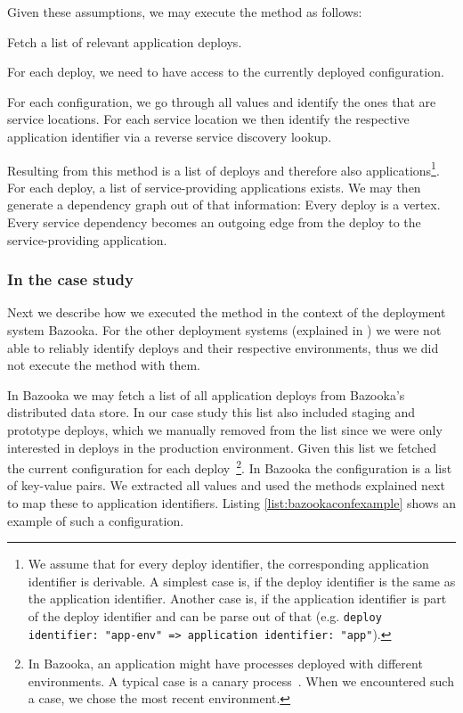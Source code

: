 Given these assumptions, we may execute the method as follows:
\begin{tenumerate}
  \item Fetch a list of relevant application deploys.
  \item For each deploy, we need to have access to the currently deployed configuration.
  \item For each configuration, we go through all values and identify the ones that are service locations. For each service location we then identify the respective application identifier via a reverse service discovery lookup.
\end{tenumerate}

\vfill\clearpage

Resulting from this method is a list of deploys and therefore also applications\footnote{We assume that for every deploy identifier, the corresponding application identifier is derivable. A simplest case is, if the deploy identifier is the same as the application identifier. Another case is, if the application identifier is part of the deploy identifier and can be parse out of that (e.g. \lstinline{deploy identifier: "app-env" => application identifier: "app"}).}. For each deploy, a list of service-providing applications exists. We may then generate a dependency graph out of that information: Every deploy is a vertex. Every service dependency becomes an outgoing edge from the deploy to the service-providing application.

\subsubsection{In the case study}

Next we describe how we executed the method in the context of the deployment system Bazooka. For the other deployment systems (explained in ) we were not able to reliably identify deploys and their respective environments, thus we did not execute the method with them.

In Bazooka we may fetch a list of all application deploys from Bazooka's distributed data store. In our case study this list also included staging and prototype deploys, which we manually removed from the list since we were only interested in deploys in the production environment. Given this list we fetched the current configuration for each deploy~\footnote{In Bazooka, an application might have processes deployed with different environments. A typical case is a canary process~\cite{canary}. When we encountered such a case, we chose the most recent environment.}. In Bazooka the configuration is a list of key-value pairs. We extracted all values and used the methods explained next to map these to application identifiers. Listing \ref{list:bazookaconfexample} shows an example of such a configuration.

